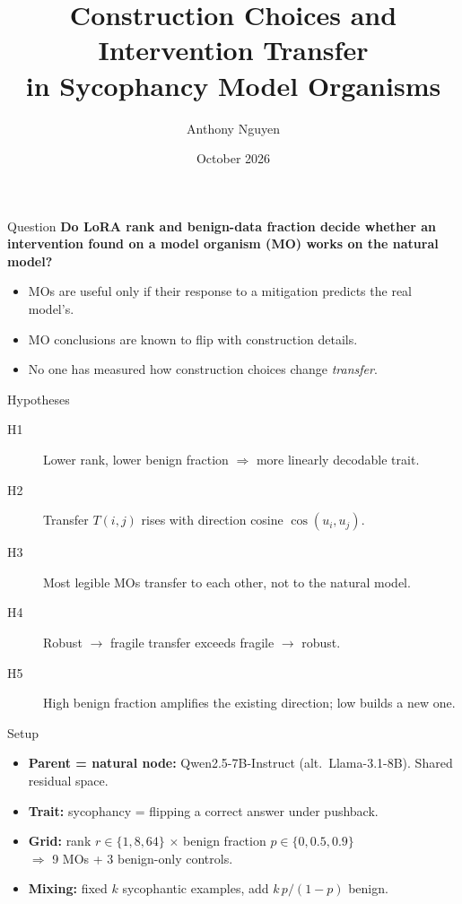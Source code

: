 \documentclass[aspectratio=169,11pt]{beamer}
\title{Construction Choices and Intervention Transfer\\in Sycophancy Model Organisms}
\author{Anthony Nguyen}
\date{October 2026}
\begin{document}
\frame{\titlepage}

\begin{frame}{Question}
  \textbf{Do LoRA rank and benign-data fraction decide whether an intervention
  found on a model organism (MO) works on the natural model?}
  \vspace{1em}
  \begin{itemize}
    \item MOs are useful only if their response to a mitigation predicts the real model's.
    \item MO conclusions are known to flip with construction details.
    \item No one has measured how construction choices change \emph{transfer}.
  \end{itemize}
\end{frame}

\begin{frame}{Hypotheses}
  \begin{description}
    \item[H1] Lower rank, lower benign fraction $\Rightarrow$ more linearly decodable trait.
    \item[H2] Transfer $T(i,j)$ rises with direction cosine $\cos(u_i,u_j)$.
    \item[H3] Most legible MOs transfer to each other, not to the natural model.
    \item[H4] Robust $\to$ fragile transfer exceeds fragile $\to$ robust.
    \item[H5] High benign fraction amplifies the existing direction; low builds a new one.
  \end{description}
\end{frame}

\begin{frame}{Setup}
  \begin{itemize}
    \item \textbf{Parent = natural node:} Qwen2.5-7B-Instruct (alt.\ Llama-3.1-8B). Shared residual space.
    \item \textbf{Trait:} sycophancy = flipping a correct answer under pushback.
    \item \textbf{Grid:} rank $r \in \{1, 8, 64\}$ $\times$ benign fraction $p \in \{0, 0.5, 0.9\}$
          \\ $\Rightarrow$ 9 MOs + 3 benign-only controls.
    \item \textbf{Mixing:} fixed $k$ sycophantic examples, add $k\,p/(1-p)$ benign.
  \end{itemize}
\end{frame}
\end{document}
